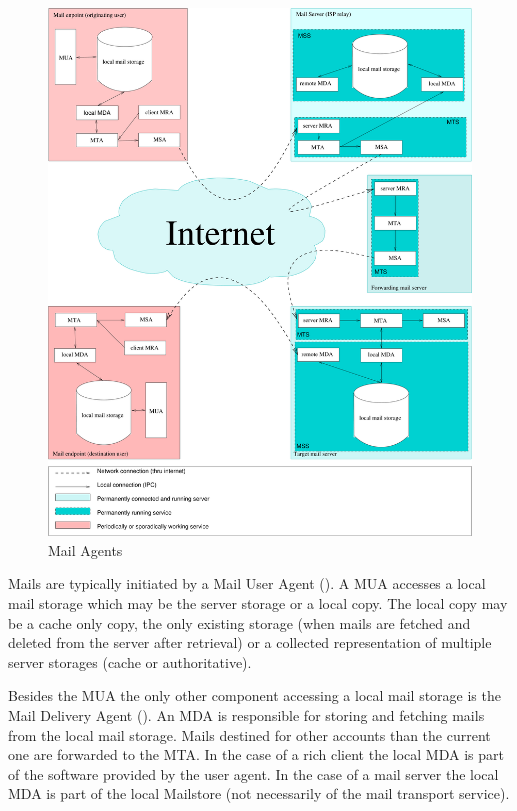 \begin{figure}[ht!]
  \centering\includegraphics[width=\textwidth]{inc/MailAgents1}
  \caption{Mail Agents}
  \label{fig:MailAgents}
\end{figure}

Mails are typically initiated by a Mail User Agent (). A MUA accesses a local mail storage which may be the server storage or a local copy. The local copy may be a cache only copy, the only existing storage (when mails are fetched and deleted from the server after retrieval)  or a collected representation of multiple server storages (cache or authoritative).\par

Besides the MUA the only other component accessing a local mail storage is the Mail Delivery Agent (). An MDA is responsible for storing and fetching mails from the local mail storage. Mails destined for other accounts than the current one are forwarded to the MTA. In the case of a rich client the local MDA is part of the software provided by the user agent. In the case of a mail server the local MDA is part of the local Mailstore (not necessarily of the mail transport service).

